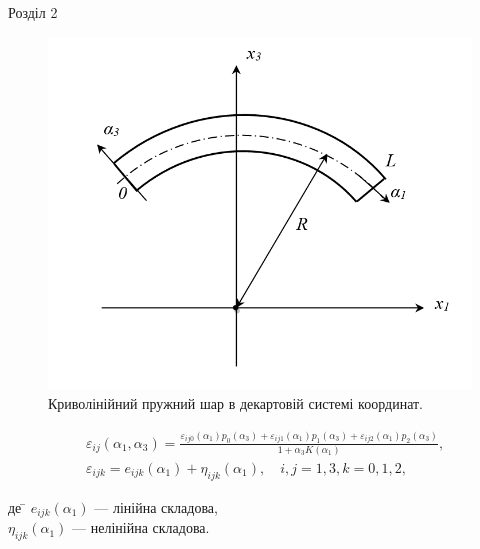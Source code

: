 \documentclass[handout, 8pt]{beamer}
\numberwithin{figure}{section}
\numberwithin{equation}{section}
\numberwithin{table}{section}
\begin{document}
\begin{frame}{Розділ 2}
\begin{figure}
\includegraphics[scale=0.25]{pic/cylplate_2D.png}
\caption{Криволінійний пружний шар в декартовій системі координат.}
\end{figure}
\begin{equation}
\begin{aligned}
&\varepsilon_{ij} \left( \alpha_1, \alpha_3 \right) = \frac{\varepsilon_{ij0} \left( \alpha_1\right)p_0 \left( \alpha_3\right)+\varepsilon_{ij1} \left( \alpha_1\right)p_1 \left( \alpha_3\right)+\varepsilon_{ij2} \left( \alpha_1\right)p_2 \left( \alpha_3\right)}{1+\alpha_3 K\left( \alpha_1 \right)},\\
&\varepsilon_{ijk} = e_{ijk}\left( \alpha_1\right)+\eta_{ijk}\left( \alpha_1\right), \quad i,j=1,3, k=0,1,2,
\end{aligned}
\end{equation}

\begin{tabbing}
де \= $e_{ijk}\left( \alpha_1\right)$ --- лінійна складова,\\
\> $\eta_{ijk}\left( \alpha_1\right)$ --- нелінійна складова.
\end{tabbing}
\end{frame}
\end{document}

